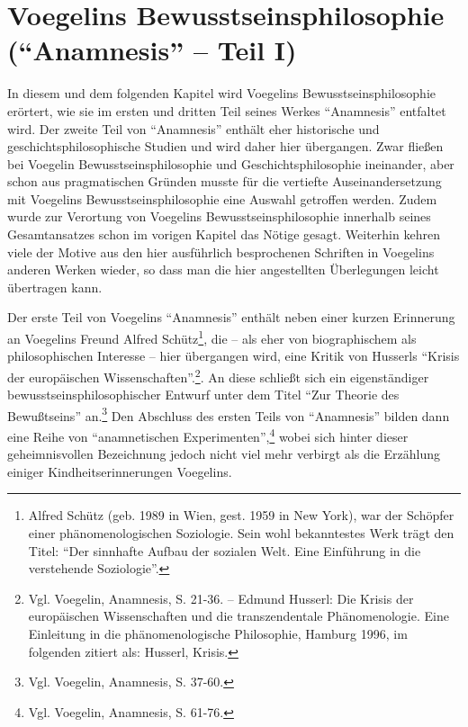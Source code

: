 

\chapter{Voegelins Bewusstseinsphilosophie ("`Anamnesis"' -- Teil I)}
\label{VoegelinsBewusstseinsphilosophie}

In diesem und dem folgenden Kapitel wird Voegelins Bewusstseinsphilosophie
erörtert, wie sie im ersten und dritten Teil seines Werkes "`Anamnesis"'
entfaltet wird. Der zweite Teil von "`Anamnesis"' enthält eher historische und
geschichtsphilosophische Studien und wird daher hier übergangen. Zwar fließen
bei Voegelin Bewusstseinsphilosophie und Geschichtsphilosophie ineinander,
aber schon aus pragmatischen Gründen musste für die vertiefte
Auseinandersetzung mit Voegelins Bewusstseinsphilosophie eine Auswahl
getroffen werden. Zudem wurde zur Verortung von Voegelins
Bewusstseinsphilosophie innerhalb seines Gesamtansatzes schon im vorigen
Kapitel das Nötige gesagt. Weiterhin kehren viele der Motive aus den hier
ausführlich besprochenen Schriften in Voegelins anderen Werken wieder, so dass
man die hier angestellten Überlegungen leicht übertragen kann.

Der erste Teil von Voegelins "`Anamnesis"' enthält neben einer kurzen
Erinnerung an Voegelins Freund Alfred Schütz\footnote{Alfred Schütz (geb. 1989
  in Wien, gest. 1959 in New York), war der Schöpfer einer phänomenologischen
  Soziologie. Sein wohl bekanntestes Werk trägt den Titel: "`Der sinnhafte
  Aufbau der sozialen Welt. Eine Einführung in die verstehende Soziologie"'.},
die -- als eher von biographischem als philosophischen Interesse -- hier
übergangen wird, eine Kritik von Husserls "`Krisis der europäischen
Wissenschaften"'.\footnote{Vgl.  Voegelin, Anamnesis, S. 21-36. -- Edmund
  Husserl: Die Krisis der europäischen Wissenschaften und die transzendentale
  Phänomenologie. Eine Einleitung in die phänomenologische Philosophie,
  Hamburg 1996, im folgenden zitiert als: Husserl, Krisis.}. An diese schließt
sich ein eigenständiger bewusstseinsphilosophischer Entwurf unter dem Titel
"`Zur Theorie des Bewußtseins"' an.\footnote{Vgl. Voegelin, Anamnesis, S.
  37-60.} Den Abschluss des ersten Teils von "`Anamnesis"' bilden dann eine
Reihe von "`anamnetischen Experimenten"',\footnote{Vgl. Voegelin, Anamnesis,
  S. 61-76.} wobei sich hinter dieser geheimnisvollen Bezeichnung jedoch
nicht viel mehr verbirgt als die Erzählung einiger Kindheitserinnerungen
Voegelins.

